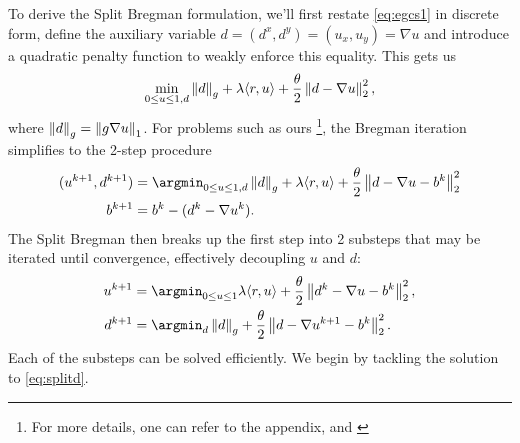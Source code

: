 To derive the Split Bregman formulation, we'll first restate \eqref{eq:egcs1} in discrete form, define the auxiliary variable $d = (d^x, d^y) = (u_x, u_y) = \nabla u$ and introduce a quadratic penalty function to weakly enforce this equality. This gets us 
\begin{align*}
\min_{0\leq u \leq 1, d} 
 \left\lVert d \right\rVert_g + \lambda  \langle r, u \rangle
+ \frac{\theta}{2} \left\lVert d - \nabla u \right\rVert_2^2,
\end{align*}
where $\left\lVert d\right\rVert_g = \left\lVert g \nabla u\right\rVert_1$. For problems such as ours \footnote{For more details, one can refer to the appendix, and \cite{goldstein2009split,goldstein2010geometric}}, the Bregman iteration simplifies to the 2-step procedure 
\begin{align*}
(u^{k+1}, d^{k+1}) 
&= \argmin_{0\leq u \leq 1, d}  \norm{d}_g + \lambda \langle r, u \rangle + \frac{\theta}{2} \norm{d - \nabla u - b^k }^2_2 
\\
b^{k+1} &= b^k - (d^k - \nabla u^k) .
\end{align*} 
The Split Bregman then breaks up the first step into 2 substeps that may be iterated until convergence, effectively decoupling $u$ and $d$: 
\begin{align}
u^{k+1} &= \argmin_{0\leq u \leq 1} \lambda \langle r, u \rangle
+ \frac{\theta}{2} \norm{d^k - \nabla u - b^k }^2_2,
\label{eq:splitu}
\\
d^{k+1} 
&= \argmin_d \norm{d}_g + \frac{\theta}{2} \norm{d - \nabla u^{k+1} - b^k}^2_2.
\label{eq:splitd}
\end{align}
Each of the substeps can be solved efficiently. We begin by tackling the solution to \eqref{eq:splitd}.

